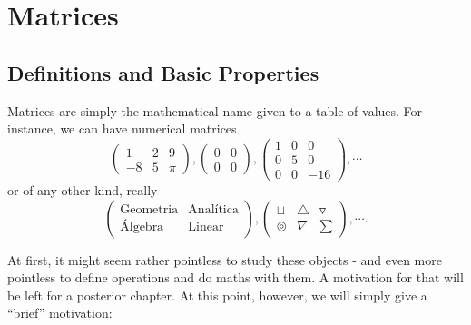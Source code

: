 \chapter{Matrices}
\section{Definitions and Basic Properties}

Matrices are simply the mathematical name given to a table of values. For instance, we can have numerical matrices
\[\begin{pmatrix}
1 & 2 & 9\\
-8 & 5 & \pi
\end{pmatrix}, \begin{pmatrix}
0 & 0\\
0 & 0
\end{pmatrix},
\begin{pmatrix}
1 & 0 & 0\\
0 & 5 & 0\\
0 & 0 & -16
\end{pmatrix},\cdots\] or of any other kind, really
\[\begin{pmatrix}
\text{Geometria} & \text{Analítica}\\
\text{Álgebra} & \text{Linear}
\end{pmatrix},\begin{pmatrix}
\sqcup & \triangle & \triangledown\\
\circledcirc & \nabla & \sum
\end{pmatrix},\cdots.\]

At first, it might seem rather pointless to study these objects - and even more pointless to define operations and do maths with them. A motivation for that will be left for a posterior chapter. At this point, however, we will simply give a ``brief'' motivation:

